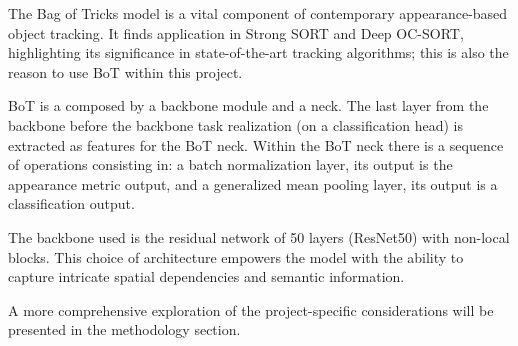 
{
    The Bag of Tricks\cite{Luo_2019_CVPR_Workshops} model is a vital component of contemporary appearance-based object tracking. 
    It finds application in Strong SORT and Deep OC-SORT, highlighting its significance in state-of-the-art tracking algorithms; 
    this is also the reason to use \ac{BoT} within this project. 
}

{
    \ac{BoT} is a composed by a backbone module and a neck. 
    The last layer from the backbone before the backbone task realization (on a classification head) is extracted as features for the \ac{BoT} neck. 
    Within the \ac{BoT} neck there is a sequence of operations consisting in: a batch normalization layer, its output is the appearance metric output, and a generalized mean pooling layer, its output is a classification output. 
}

{
    The backbone used is the residual network of 50 layers (ResNet50) with non-local blocks. 
    This choice of architecture empowers the model with the ability to capture intricate spatial dependencies and semantic information. 
}

{
    A more comprehensive exploration of the project-specific considerations will be presented in the methodology section.
}

